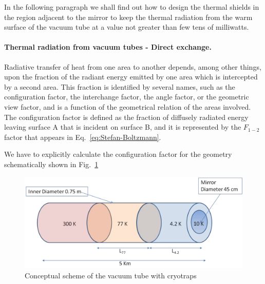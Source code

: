 In the following paragraph we shall find out how to design the thermal shields in the region adjacent to the mirror to keep the thermal radiation from the warm surface of the vacuum tube at a value not greater than few tens of milliwatts.

\paragraph{Thermal radiation from vacuum tubes - Direct exchange. \newline}

Radiative transfer of heat from one area to another depends, among
other things, upon the fraction of the radiant energy emitted by one area
which is intercepted by a second area. This fraction is identified by
several names, such as the configuration factor, the interchange factor,
the angle factor, or the geometric view factor, and is a function of the
geometrical relation of the areas involved. The configuration factor is defined as the fraction of diffusely radiated energy leaving surface A that is incident on surface B, and it is represented by the $F_{1-2}$ factor that appears in Eq.~\ref{eq:Stefan-Boltzmann}. 

We have to explicitly calculate the configuration factor for the geometry schematically shown in Fig.~\ref{fig:vacuum-tube}
\begin{figure}[htbp]
\begin{center}
 \includegraphics[width=12cm]{Sec_SiteInfra/Cryotraps/vacuum-tube.pdf}
			\caption{Conceptual scheme of the vacuum tube with cryotraps}
\label{fig:vacuum-tube}
\end{center}
\end{figure}

